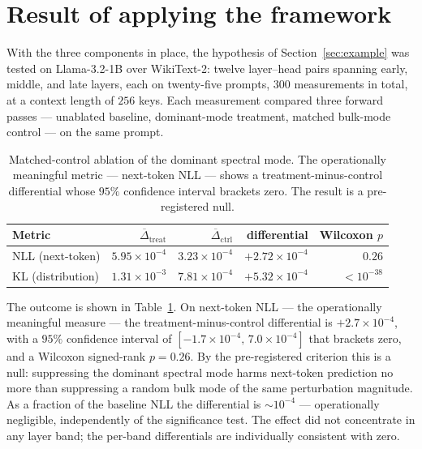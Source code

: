 \documentclass[11pt]{article}
\begin{document}
\section{Result of applying the framework}
\label{sec:result}

With the three components in place, the hypothesis of
Section~\ref{sec:example} was tested on Llama-3.2-1B over WikiText-2:
twelve layer--head pairs spanning early, middle, and late layers, each on
twenty-five prompts, $300$ measurements in total, at a context length of
$256$ keys. Each measurement compared three forward passes --- unablated
baseline, dominant-mode treatment, matched bulk-mode control --- on the
same prompt.

\begin{table}[t]
  \centering
  \caption{Matched-control ablation of the dominant spectral mode. The
  operationally meaningful metric --- next-token NLL --- shows a
  treatment-minus-control differential whose $95\%$ confidence interval
  brackets zero. The result is a pre-registered null.}
  \label{tab:result}
  \begin{tabular}{lrrrr}
    \toprule
    Metric & $\overline{\Delta}_{\mathrm{treat}}$
           & $\overline{\Delta}_{\mathrm{ctrl}}$
           & differential & Wilcoxon $p$ \\
    \midrule
    NLL (next-token) & $5.95\times10^{-4}$ & $3.23\times10^{-4}$
      & $+2.72\times10^{-4}$ & $0.26$ \\
    KL (distribution) & $1.31\times10^{-3}$ & $7.81\times10^{-4}$
      & $+5.32\times10^{-4}$ & $<10^{-38}$ \\
    \bottomrule
  \end{tabular}
\end{table}

The outcome is shown in Table~\ref{tab:result}. On next-token NLL --- the
operationally meaningful measure --- the treatment-minus-control
differential is $+2.7\times10^{-4}$, with a $95\%$ confidence interval of
$[-1.7\times10^{-4},\,7.0\times10^{-4}]$ that brackets zero, and a
Wilcoxon signed-rank $p=0.26$. By the pre-registered criterion this is a
null: suppressing the dominant spectral mode harms next-token prediction
no more than suppressing a random bulk mode of the same perturbation
magnitude. As a fraction of the baseline NLL the differential is
$\sim10^{-4}$ --- operationally negligible, independently of the
significance test. The effect did not concentrate in any layer band; the
per-band differentials are individually consistent with zero.
\end{document}
